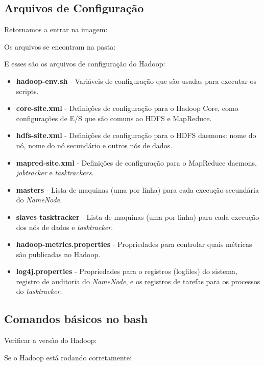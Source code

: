 \documentclass[a4paper,11pt]{article}
\begin{document}
\subsection{Arquivos de Configuração}
Retornamos a entrar na imagem: \\

Os arquivos se encontram na pasta: \\

E esses são os arquivos de configuração do Hadoop: \vspace{-1em}
\begin{itemize}
	\item \textbf{hadoop-env.sh} - Variáveis de configuração que são usadas para executar os scripts.
	\item \textbf{core-site.xml} - Definições de configuração para o Hadoop Core, como configurações de E/S que são comuns ao HDFS e MapReduce.
	\item \textbf{hdfs-site.xml} - Definições de configuração para o HDFS daemons: nome do nó, nome do nó secundário e outros nós de dados.
	\item \textbf{mapred-site.xml} - Definições de configuração para o MapReduce daemons, \textit{jobtracker} e \textit{tasktrackers}.
	\item \textbf{masters} - Lista de maquinas (uma por linha) para cada execução secundária do \textit{NameNode}.
	\item \textbf{slaves tasktracker} - Lista de maquinas (uma por linha) para cada execução dos nós de dados e \textit{tasktracker}.
	\item \textbf{hadoop-metrics.properties} - Propriedades para controlar quais métricas são publicadas no Hadoop.
	\item \textbf{log4j.properties} - Propriedades para o registros (logfiles) do sistema, registro de auditoria do \textit{NameNode}, e os registros de tarefas para os processos do \textit{tasktracker}.
\end{itemize}

\subsection{Comandos básicos no bash}
Verificar a versão do Hadoop: \\

Se o Hadoop está rodando corretamente: \\
\end{document}
